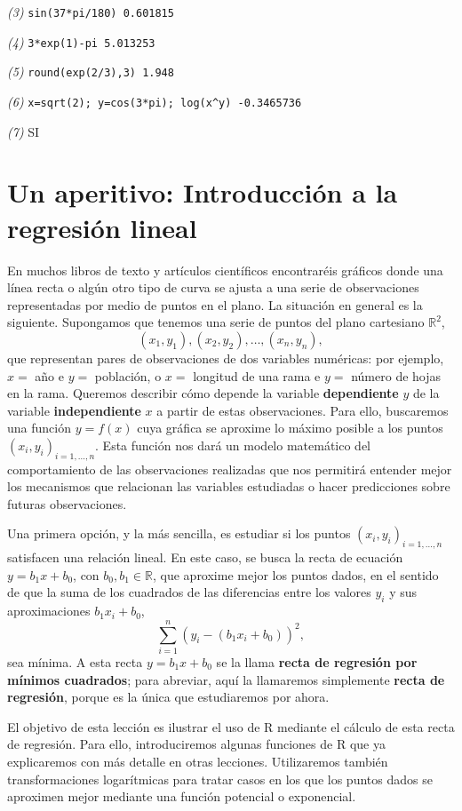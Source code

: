 \documentclass[]{book}
\theoremstyle{definition}
\theoremstyle{definition}
\theoremstyle{definition}
\theoremstyle{remark}
\begin{document}
\emph{(3)} \texttt{sin(37*pi/180)\ 0.601815}

\emph{(4)} \texttt{3*exp(1)-pi\ 5.013253}

\emph{(5)} \texttt{round(exp(2/3),3)\ 1.948}

\emph{(6)} \texttt{x=sqrt(2);\ y=cos(3*pi);\ log(x\^{}y)\ -0.3465736}

\emph{(7)} SI

\hypertarget{chap:lm}{%
\chapter{Un aperitivo: Introducción a la regresión lineal}\label{chap:lm}}

En muchos libros de texto y artículos científicos encontraréis gráficos donde una línea recta o algún otro tipo de curva se ajusta a una serie de observaciones representadas por medio de puntos en el plano. La situación en general es la siguiente. Supongamos que tenemos una serie de puntos del plano cartesiano \(\mathbb{R}^2\),
\[
(x_1,y_1), (x_2,y_2),\ldots,(x_n,y_n),
\]
que representan pares de observaciones de dos variables numéricas: por ejemplo, \(x=\) año e \(y=\) población, o \(x=\) longitud de una rama e \(y=\) número de hojas en la rama. Queremos describir cómo depende la variable \textbf{dependiente} \(y\) de la variable \textbf{independiente} \(x\) a partir de estas observaciones. Para ello, buscaremos una función \(y=f(x)\) cuya gráfica se aproxime lo máximo posible a los puntos \((x_i,y_i)_{i=1,\ldots,n}\). Esta función nos dará un modelo matemático del comportamiento de las observaciones realizadas que nos permitirá entender mejor los mecanismos que relacionan las variables estudiadas o hacer predicciones sobre futuras observaciones.

Una primera opción, y la más sencilla, es estudiar si los puntos
\((x_i,y_i)_{i=1,\ldots,n}\) satisfacen una relación lineal. En este caso, se busca la recta de ecuación \(y=b_1x+b_0\), con \(b_0,b_1\in \mathbb{R}\), que aproxime mejor los puntos dados, en el sentido de que la suma
de los cuadrados de las diferencias entre los valores \(y_i\) y sus aproximaciones \(b_1x_i+b_0\),
\[
\sum_{i=1}^n (y_i-(b_1x_i+b_0))^2,
\]
sea mínima. A esta recta \(y=b_1x+b_0\) se la llama \textbf{recta de regresión por mínimos cuadrados}; para abreviar, aquí la llamaremos simplemente \textbf{recta de regresión}, porque es la única que estudiaremos por ahora.

El objetivo de esta lección es ilustrar el uso de R mediante el cálculo de esta recta de regresión. Para ello, introduciremos algunas funciones de R que ya explicaremos con más detalle en otras lecciones. Utilizaremos también transformaciones logarítmicas para tratar casos en los que los puntos dados se aproximen mejor mediante una función potencial o exponencial.
\end{document}
